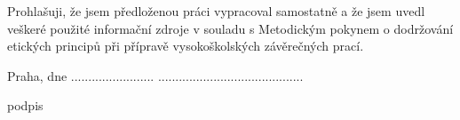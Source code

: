 Prohlašuji, že jsem předloženou práci vypracoval samostatně a že jsem uvedl veškeré použité informační zdroje v souladu s Metodickým pokynem o dodržování etických principů při přípravě vysokoškolských závěrečných prací.\newline


\noindent Praha, dne ........................ \hfill ..........................................
\noindent \begin{flushright}
podpis
\end{flushright}

